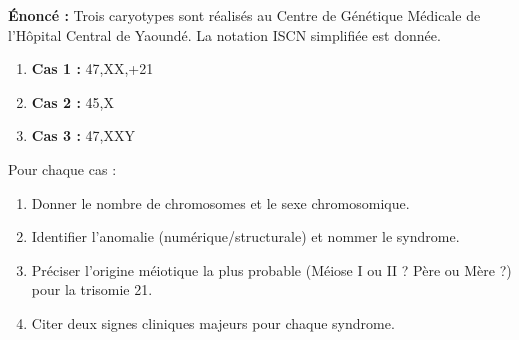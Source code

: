 \documentclass[11pt]{article}
\begin{document}
\begin{exoresolu}
    \textbf{Énoncé :} Trois caryotypes sont réalisés au Centre de Génétique Médicale de l'Hôpital Central de Yaoundé. La notation ISCN simplifiée est donnée.
    \begin{enumerate}
        \item \textbf{Cas 1 :} 47,XX,+21
        \item \textbf{Cas 2 :} 45,X
        \item \textbf{Cas 3 :} 47,XXY
    \end{enumerate}
    Pour chaque cas :
    \begin{enumerate}
        \item Donner le nombre de chromosomes et le sexe chromosomique.
        \item Identifier l'anomalie (numérique/structurale) et nommer le syndrome.
        \item Préciser l'origine méiotique la plus probable (Méiose I ou II ? Père ou Mère ?) pour la trisomie 21.
        \item Citer deux signes cliniques majeurs pour chaque syndrome.
    \end{enumerate}


\end{exoresolu}
\end{document}
